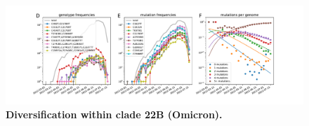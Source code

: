 \begin{figure}[h]
    \includegraphics[width=\textwidth]{figures/counts/22B_counts.pdf}
    \caption{{\bf Diversification within clade 22B (Omicron).}
    \label{fig:22B_counts}}
\end{figure}

